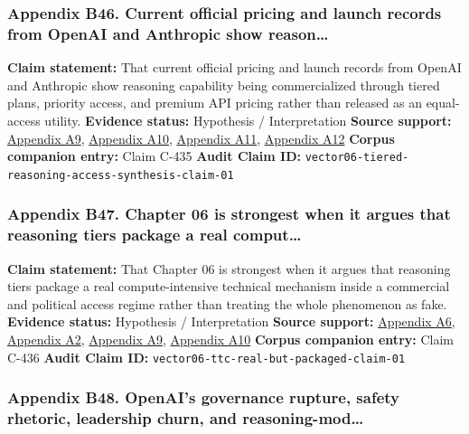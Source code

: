 \documentclass[
  american,
  11pt,
  letterpaper,
]{article}
\begin{document}
\subsubsection{Appendix B46. Current official pricing and launch records
from OpenAI and Anthropic show
reason\ldots{}}\label{ch-06-appendix-b46-current-official-pricing-and-launch-records-from-openai-and-anthropic-show-reason}

\textbf{Claim statement:} That current official pricing and launch
records from OpenAI and Anthropic show reasoning capability being
commercialized through tiered plans, priority access, and premium API
pricing rather than released as an equal-access utility.
\textbf{Evidence status:} Hypothesis / Interpretation \textbf{Source
support:}
\hyperref[ch-06-appendix-a9-chatgpt-plans-free-go-plus-pro-business-and-enterprise]{Appendix
A9}, \hyperref[ch-06-appendix-a10-pricing-openai-api]{Appendix A10},
\hyperref[ch-06-appendix-a11-plans-pricing-claude-by-anthropic]{Appendix
A11}, \hyperref[ch-06-appendix-a12-introducing-claude-4]{Appendix A12}
\textbf{Corpus companion entry:} Claim C-435 \textbf{Audit Claim ID:}
\texttt{vector06-tiered-reasoning-access-synthesis-claim-01}

\subsubsection{Appendix B47. Chapter 06 is strongest when it argues that
reasoning tiers package a real
comput\ldots{}}\label{ch-06-appendix-b47-chapter-06-is-strongest-when-it-argues-that-reasoning-tiers-package-a-real-comput}

\textbf{Claim statement:} That Chapter 06 is strongest when it argues
that reasoning tiers package a real compute-intensive technical
mechanism inside a commercial and political access regime rather than
treating the whole phenomenon as fake. \textbf{Evidence status:}
Hypothesis / Interpretation \textbf{Source support:}
\hyperref[ch-06-appendix-a6-scaling-llm-test-time-compute-optimally-can-be-more-effective-than-scaling-model-parameters]{Appendix
A6}, \hyperref[ch-06-appendix-a2-openai-o1-system-card]{Appendix A2},
\hyperref[ch-06-appendix-a9-chatgpt-plans-free-go-plus-pro-business-and-enterprise]{Appendix
A9}, \hyperref[ch-06-appendix-a10-pricing-openai-api]{Appendix A10}
\textbf{Corpus companion entry:} Claim C-436 \textbf{Audit Claim ID:}
\texttt{vector06-ttc-real-but-packaged-claim-01}

\subsubsection{Appendix B48. OpenAI's governance rupture, safety
rhetoric, leadership churn, and
reasoning-mod\ldots{}}\label{ch-06-appendix-b48-openai-s-governance-rupture-safety-rhetoric-leadership-churn-and-reasoning-mod}
\end{document}
